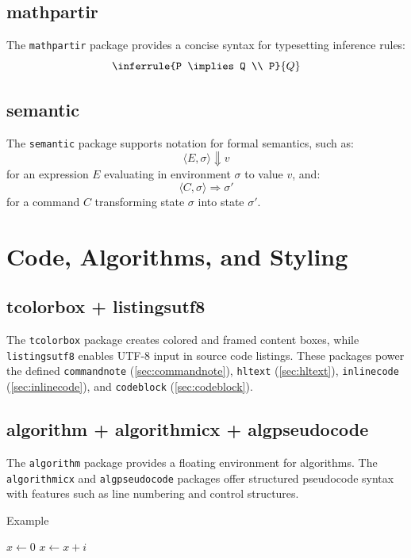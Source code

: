 \documentclass{lecturenotes}
\begin{document}
\subsection{mathpartir}
The \texttt{mathpartir} package \cite{ctan:mathpartir} provides a concise syntax for typesetting inference rules:
\[
\inferrule{P \implies Q \\ P}{Q}
\]


\subsection{semantic}
The \texttt{semantic} package \cite{ctan:semantic} supports notation for formal semantics, such as:
\[
\langle E, \sigma \rangle \Downarrow v
\]
for an expression \(E\) evaluating in environment \(\sigma\) to value \(v\), and:
\[
\langle C, \sigma \rangle \Rightarrow \sigma'
\]
for a command \(C\) transforming state \(\sigma\) into state \(\sigma'\).



\newpage
\section{Code, Algorithms, and Styling}

\subsection{tcolorbox + listingsutf8}
The \texttt{tcolorbox} package \cite{ctan:tcolorbox} creates colored and framed content boxes, while \texttt{listingsutf8} \cite{ctan:listingsutf8} enables UTF-8 input in source code listings. These packages power the defined \texttt{commandnote} (\ref{sec:commandnote}), 
\texttt{hltext} (\ref{sec:hltext}), 
\texttt{inlinecode} (\ref{sec:inlinecode}), 
and \texttt{codeblock} (\ref{sec:codeblock}).


\subsection{algorithm + algorithmicx + algpseudocode}
The \texttt{algorithm} package \cite{ctan:algorithms} provides a floating environment for algorithms. The \texttt{algorithmicx} \cite{ctan:algorithmicx} and \texttt{algpseudocode} \cite{ctan:algpseudocodex} packages offer structured pseudocode syntax with features such as line numbering and control structures.

\begin{algorithm}
\caption{Example}
\begin{algorithmic}[1]
\State $x \gets 0$
  \State $x \gets x + i$
\EndFor
\end{algorithmic}
\end{algorithm}
\end{document}

